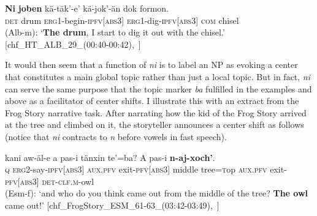 \documentclass[output=paper
,modfonts
,nonflat]{langsci/langscibook}
\begin{document}
\ea \label{ex:pico:24}

\gll \textbf{Ni} \textbf{joben} k\"a-t\"ak'-e' k\"a-jok'-\"an dok formon. \\
\textsc{det} {drum} \textsc{erg1}-begin-\textsc{ipfv[abs3]} \textsc{erg1}-dig-\textsc{ipfv[abs3]} \textsc{com} {chisel}\\
\glt (Alb-m): `\textbf{The drum}, I start to dig it out with the chisel.' [chf\_HT\_ALB\_29\_(00:40-00:42),~\citealt{Delgado-Galvan2018archive}]

\z

It would then seem that a function of \textit{ni} is to label an NP as evoking a center that constitutes a main global topic rather than just a local topic. But in fact, \textit{ni} can serve the same purpose that the topic marker \textit{ba} fulfilled in the examples  and 
 above as a facilitator of center shifts. I illustrate this with an extract from the Frog Story narrative task.
After narrating how the kid of the Frog Story arrived at the tree and climbed on it, the storyteller announces a center shift as follows (notice that \textit{ni} contracts to \textit{n} before vowels in fast speech).


\ea \label{ex:pico:25}

\gll kani aw-äl-e a pas-i tänxin te'=ba? A pas-i \textbf{n-aj-xoch'}. \\
\textsc{q} \textsc{erg2}-say-\textsc{ipfv[abs3]} \textsc{aux.pfv} exit-\textsc{pfv[abs3]} {middle} tree={\textsc top} \textsc{aux.pfv} exit-\textsc{pfv[abs3]} \textsc{det}-\textsc{clf.m}-owl\\
\glt (Esm-f): `and who do you think came out from the middle of the tree? \textbf{The owl} came out!' [chf\_FrogStory\_ESM\_61-63\_(03:42-03:49),~\citealt{Delgado-Galvan2018archive}]

\z
\end{document}
